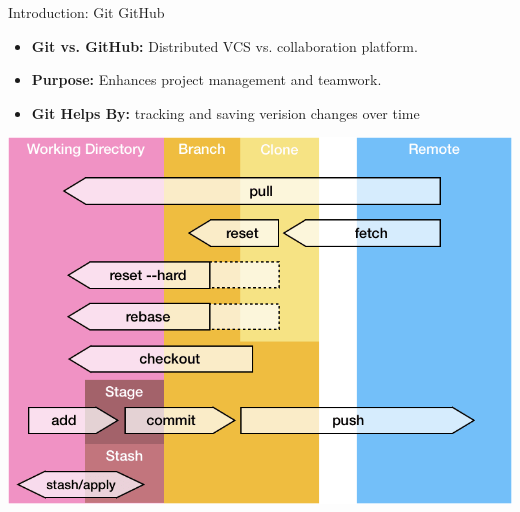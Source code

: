 \documentclass[aspectratio=169]{beamer}
\begin{document}
\begin{frame}{Introduction: Git GitHub}
    \begin{itemize}
        \item \textbf{Git vs. GitHub:} Distributed VCS vs. collaboration platform.
        \item \textbf{Purpose:} Enhances project management and teamwork.
        \item \textbf{Git Helps By:} tracking and saving verision changes over time
    \end{itemize}
    \begin{center}
        \includegraphics[scale=.25]{git_commands.png}
    \end{center}
\end{frame}
\end{document}
